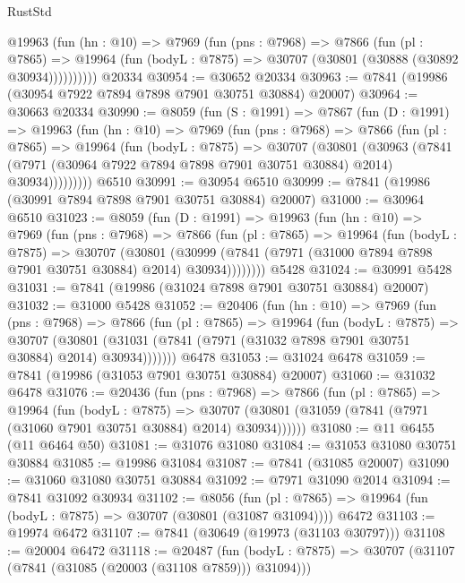 \begin{lexlean}{RustStd}
\begin{coremodule}
        @19963
          (fun (hn : @10) =>
          @7969
            (fun (pns : @7968) =>
            @7866
              (fun (pl : @7865) =>
              @19964 (fun (bodyL : @7875) => @30707 (@30801 (@30888 (@30892 @30934))))))))))
    @20334
@30954 := @30652 @20334
@30963 := @7841 (@19986 (@30954 @7922 @7894 @7898 @7901 @30751 @30884) @20007)
@30964 := @30663 @20334
@30990 := @8059
    (fun (S : @1991) =>
    @7867
      (fun (D : @1991) =>
      @19963
        (fun (hn : @10) =>
        @7969
          (fun (pns : @7968) =>
          @7866
            (fun (pl : @7865) =>
            @19964
              (fun (bodyL : @7875) =>
              @30707
                (@30801
                  (@30963
                    (@7841
                      (@7971 (@30964 @7922 @7894 @7898 @7901 @30751 @30884) @2014)
                      @30934)))))))))
    @6510
@30991 := @30954 @6510
@30999 := @7841 (@19986 (@30991 @7894 @7898 @7901 @30751 @30884) @20007)
@31000 := @30964 @6510
@31023 := @8059
    (fun (D : @1991) =>
    @19963
      (fun (hn : @10) =>
      @7969
        (fun (pns : @7968) =>
        @7866
          (fun (pl : @7865) =>
          @19964
            (fun (bodyL : @7875) =>
            @30707
              (@30801
                (@30999 (@7841 (@7971 (@31000 @7894 @7898 @7901 @30751 @30884) @2014) @30934))))))))
    @5428
@31024 := @30991 @5428
@31031 := @7841 (@19986 (@31024 @7898 @7901 @30751 @30884) @20007)
@31032 := @31000 @5428
@31052 := @20406
    (fun (hn : @10) =>
    @7969
      (fun (pns : @7968) =>
      @7866
        (fun (pl : @7865) =>
        @19964
          (fun (bodyL : @7875) =>
          @30707
            (@30801 (@31031 (@7841 (@7971 (@31032 @7898 @7901 @30751 @30884) @2014) @30934)))))))
    @6478
@31053 := @31024 @6478
@31059 := @7841 (@19986 (@31053 @7901 @30751 @30884) @20007)
@31060 := @31032 @6478
@31076 := @20436
    (fun (pns : @7968) =>
    @7866
      (fun (pl : @7865) =>
      @19964
        (fun (bodyL : @7875) =>
        @30707 (@30801 (@31059 (@7841 (@7971 (@31060 @7901 @30751 @30884) @2014) @30934))))))
@31080 := @11 @6455 (@11 @6464 @50)
@31081 := @31076 @31080
@31084 := @31053 @31080 @30751 @30884
@31085 := @19986 @31084
@31087 := @7841 (@31085 @20007)
@31090 := @31060 @31080 @30751 @30884
@31092 := @7971 @31090 @2014
@31094 := @7841 @31092 @30934
@31102 := @8056
    (fun (pl : @7865) => @19964 (fun (bodyL : @7875) => @30707 (@30801 (@31087 @31094))))
    @6472
@31103 := @19974 @6472
@31107 := @7841 (@30649 (@19973 (@31103 @30797)))
@31108 := @20004 @6472
@31118 := @20487
    (fun (bodyL : @7875) => @30707 (@31107 (@7841 (@31085 (@20003 (@31108 @7859))) @31094)))

\end{coremodule}
\end{lexlean}
